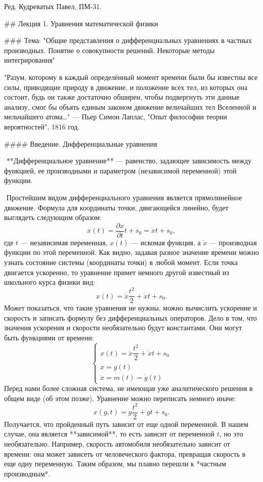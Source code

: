 Ред. Кудреватых Павел, ПМ-31.

## Лекция 1. Уравнения математической физики

### Тема:  "Общие представления о дифференциальных уравнениях в частных производных. Понятие о совокупности решений. Некоторые методы интегрирования"

"Разум, которому в каждый определённый момент времени были бы известны все силы, приводящие природу в движение, и положение всех тел, из которых она состоит, будь он также достаточно обширен, чтобы подвергнуть эти данные анализу, смог бы объять единым законом движение величайших тел Вселенной и мельчайшего атома…" — Пьер Симон Лаплас, "Опыт философии теории вероятностей", 1816 год.

#### Введение. Дифференциальные уравнения

​	**Дифференциальное уравнение** — равенство, задающее зависимость между функцией, ее производными и параметром (независимой переменной) этой функции.

​	Простейшим видом дифференциального уравнения является прямолинейное движение. Формула для координаты точки, двигающейся линейно, будет выглядеть следующим образом:
$$
x(t) = \frac{\partial  x}{\partial  t}t + s_0 =  \dot{x} t + s_0,
$$
где $t$ — независимая переменная, $x(t)$ — искомая функция, а $\dot x$ — производная функции по этой переменной. Как видно, задавая разное значение времени можно узнать состояние системы (координаты точки) в любой момент. Если точка двигается ускоренно, то уравнение примет немного другой известный из школьного курса физики вид:
$$
x(t) =    \ddot{x} \frac{t^2}{2} +\dot{x} t + s_0.
$$
​	Может показаться, что такие уравнения не нужны, можно вычислить ускорение и скорость и записать формулу без дифференциальных операторов. Дело в том, что значения ускорения и скорости необязательно будут константами. Они могут быть функциями от времени:
$$
   \begin{cases}
      x(t) =    \ddot{x} \dfrac{t^2}{2} +\dot{x} t + s_0 \\
   \dot x = g(t) \\
      \ddot x = m(t) = \dot g(t)
      \end{cases}
$$
   Перед нами более сложная система, не имеющая уже аналитического решения в общем виде (об этом позже). Уравнение можно переписать немного иначе:
$$
x(g,t) = \dot g \frac{t^2}{2} + gt + s_0.
$$
​	Получается, что пройденный путь зависит от еще одной переменной. В нашем случае, она является **зависимой**, то есть зависит от переменной $t$, но это необязательно. Например, скорость автомобиля необязательно зависит от времени: она может зависеть от человеческого фактора, превращая скорость в еще одну переменную. Таким образом, мы плавно перешли к *частным производным*.

